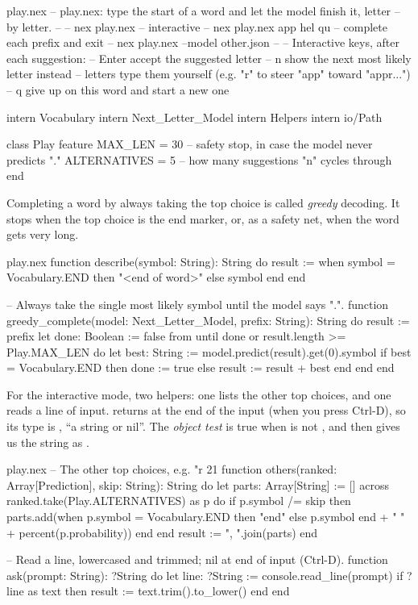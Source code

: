 \documentclass[11pt,a4paper,oneside,openany]{book}
\newcommand{\code}[1]{\texttt{\detokenize{#1}}}
\begin{document}
\begin{newfile}{play.nex}
-- play.nex: type the start of a word and let the model finish it, letter
-- by letter.
--
--   nex play.nex                    -- interactive
--   nex play.nex app hel qu         -- complete each prefix and exit
--   nex play.nex --model other.json
--
-- Interactive keys, after each suggestion:
--   Enter      accept the suggested letter
--   n          show the next most likely letter instead
--   letters    type them yourself (e.g. "r" to steer "app" toward "appr...")
--   q          give up on this word and start a new one

intern Vocabulary
intern Next_Letter_Model
intern Helpers
intern io/Path

class Play
feature
  MAX_LEN = 30        -- safety stop, in case the model never predicts "."
  ALTERNATIVES = 5    -- how many suggestions "n" cycles through
end
\end{newfile}

Completing a word by always taking the top choice is called
\emph{greedy} decoding. It stops when the top choice is the end marker,
or, as a safety net, when the word gets very long.

\begin{append}{play.nex}
function describe(symbol: String): String do
  result := when symbol = Vocabulary.END then "<end of word>" else symbol end
end

-- Always take the single most likely symbol until the model says ".".
function greedy_complete(model: Next_Letter_Model, prefix: String): String do
  result := prefix
  let done: Boolean := false
  from
  until
    done or result.length >= Play.MAX_LEN
  do
    let best: String := model.predict(result).get(0).symbol
    if best = Vocabulary.END then
      done := true
    else
      result := result + best
    end
  end
end
\end{append}

For the interactive mode, two helpers: one lists the other top choices,
and one reads a line of input. \code{read_line} returns \code{nil} at the
end of the input (when you press Ctrl-D), so its type is \code{?String},
``a string or nil''. The \emph{object test} \code{?line as text} is true
when \code{line} is not \code{nil}, and then gives us the string as
\code{text}.

\begin{append}{play.nex}
-- The other top choices, e.g. "r 21%
function others(ranked: Array[Prediction], skip: String): String do
  let parts: Array[String] := []
  across ranked.take(Play.ALTERNATIVES) as p do
    if p.symbol /= skip then
      parts.add(when p.symbol = Vocabulary.END then "end" else p.symbol end
        + " " + percent(p.probability))
    end
  end
  result := ", ".join(parts)
end

-- Read a line, lowercased and trimmed; nil at end of input (Ctrl-D).
function ask(prompt: String): ?String do
  let line: ?String := console.read_line(prompt)
  if ?line as text then
    result := text.trim().to_lower()
  end
end
\end{append}
\end{document}
